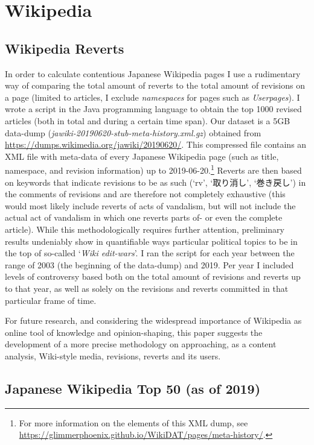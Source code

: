 \documentclass[10pt,british,A4paper,oneside]{memoir}
\begin{document}
\section{Wikipedia}\label{wikipedia}

\subsection{Wikipedia Reverts}\label{wikipedia-reverts}

In order to calculate contentious Japanese Wikipedia pages I use a
rudimentary way of comparing the total amount of reverts to the total
amount of revisions on a page (limited to articles, I exclude
\emph{namespaces} for pages such as \emph{Userpages}). I wrote a script
in the Java programming language to obtain the top 1000 revised articles
(both in total and during a certain time span). Our dataset is a 5GB
data-dump (\emph{jawiki-20190620-stub-meta-history.xml.gz}) obtained
from \url{https://dumps.wikimedia.org/jawiki/20190620/}. This compressed
file contains an XML file with meta-data of every Japanese Wikipedia
page (such as title, namespace, and revision information) up to
2019-06-20.\footnote{For more information on the elements of this XML
  dump, see
  \url{https://glimmerphoenix.github.io/WikiDAT/pages/meta-history/}.}
Reverts are then based on keywords that indicate revisions to be as such
(`rv', `取り消し', `巻き戻し') in the comments of revisions and are
therefore not completely exhaustive (this would most likely include
reverts of acts of vandalism, but will not include the actual act of
vandalism in which one reverts parts of- or even the complete article).
While this methodologically requires further attention, preliminary
results undeniably show in quantifiable ways particular political topics
to be in the top of so-called `\emph{Wiki edit-wars}'. I ran the script
for each year between the range of 2003 (the beginning of the data-dump)
and 2019. Per year I included levels of controversy based both on the
total amount of revisions and reverts up to that year, as well as solely
on the revisions and reverts committed in that particular frame of time.

For future research, and considering the widespread importance of
Wikipedia as online tool of knowledge and opinion-shaping, this paper
suggests the development of a more precise methodology on approaching,
as a content analysis, Wiki-style media, revisions, reverts and its
users.

\subsection{Japanese Wikipedia Top 50 (as of
2019)}\label{japanese-wikipedia-top-50-as-of-2019}
\end{document}

